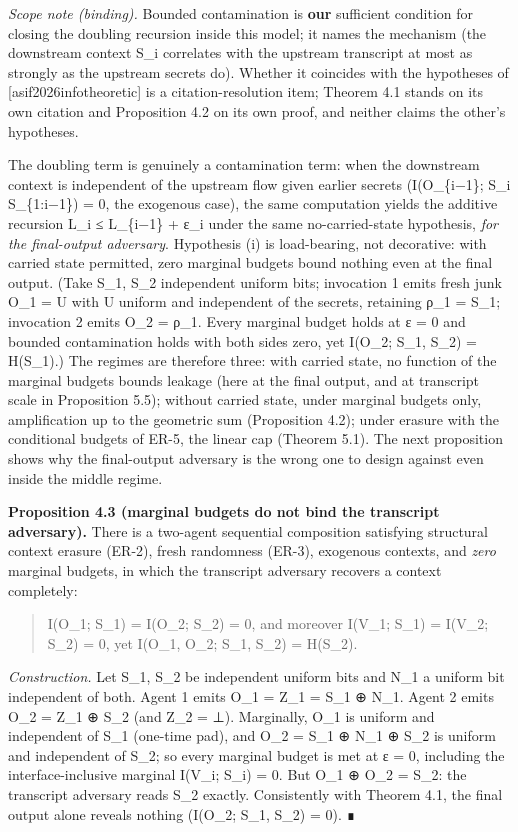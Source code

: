 \documentclass[
  11pt,
]{article}
\begin{document}
\emph{Scope note (binding).} Bounded contamination is \textbf{our}
sufficient condition for closing the doubling recursion inside this
model; it names the mechanism (the downstream context S\_i correlates
with the upstream transcript at most as strongly as the upstream secrets
do). Whether it coincides with the hypotheses of
{[}asif2026infotheoretic{]} is a citation-resolution item; Theorem 4.1
stands on its own citation and Proposition 4.2 on its own proof, and
neither claims the other's hypotheses.

The doubling term is genuinely a contamination term: when the downstream
context is independent of the upstream flow given earlier secrets
(I(O\_\{i−1\}; S\_i \textbar{} S\_\{1:i−1\}) = 0, the exogenous case),
the same computation yields the additive recursion L\_i ≤ L\_\{i−1\} +
ε\_i under the same no-carried-state hypothesis, \emph{for the
final-output adversary}. Hypothesis (i) is load-bearing, not decorative:
with carried state permitted, zero marginal budgets bound nothing even
at the final output. (Take S\_1, S\_2 independent uniform bits;
invocation 1 emits fresh junk O\_1 = U with U uniform and independent of
the secrets, retaining ρ\_1 = S\_1; invocation 2 emits O\_2 = ρ\_1.
Every marginal budget holds at ε = 0 and bounded contamination holds
with both sides zero, yet I(O\_2; S\_1, S\_2) = H(S\_1).) The regimes
are therefore three: with carried state, no function of the marginal
budgets bounds leakage (here at the final output, and at transcript
scale in Proposition 5.5); without carried state, under marginal budgets
only, amplification up to the geometric sum (Proposition 4.2); under
erasure with the conditional budgets of ER-5, the linear cap (Theorem
5.1). The next proposition shows why the final-output adversary is the
wrong one to design against even inside the middle regime.

\textbf{Proposition 4.3 (marginal budgets do not bind the transcript
adversary).} There is a two-agent sequential composition satisfying
structural context erasure (ER-2), fresh randomness (ER-3), exogenous
contexts, and \emph{zero} marginal budgets, in which the transcript
adversary recovers a context completely:

\begin{quote}
I(O\_1; S\_1) = I(O\_2; S\_2) = 0, and moreover I(V\_1; S\_1) = I(V\_2;
S\_2) = 0, yet I(O\_1, O\_2; S\_1, S\_2) = H(S\_2).
\end{quote}

\emph{Construction.} Let S\_1, S\_2 be independent uniform bits and N\_1
a uniform bit independent of both. Agent 1 emits O\_1 = Z\_1 = S\_1 ⊕
N\_1. Agent 2 emits O\_2 = Z\_1 ⊕ S\_2 (and Z\_2 = ⊥). Marginally, O\_1
is uniform and independent of S\_1 (one-time pad), and O\_2 = S\_1 ⊕
N\_1 ⊕ S\_2 is uniform and independent of S\_2; so every marginal budget
is met at ε = 0, including the interface-inclusive marginal I(V\_i;
S\_i) = 0. But O\_1 ⊕ O\_2 = S\_2: the transcript adversary reads S\_2
exactly. Consistently with Theorem 4.1, the final output alone reveals
nothing (I(O\_2; S\_1, S\_2) = 0). ∎
\end{document}
